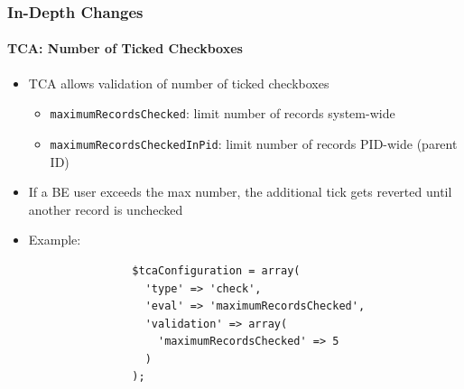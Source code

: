 \begin{frame}[fragile]
	\frametitle{In-Depth Changes}
	\framesubtitle{TCA: Number of Ticked Checkboxes}

	\lstset{
		basicstyle=\tiny\ttfamily
	}

	\begin{itemize}
		\item TCA allows validation of number of ticked checkboxes

			\begin{itemize}
				\item \texttt{maximumRecordsChecked}:\newline
					limit number of records system-wide
				\item \texttt{maximumRecordsCheckedInPid}:\newline
					limit number of records PID-wide (parent ID)
			\end{itemize}

		\item If a BE user exceeds the max number, the additional tick gets reverted until another record is unchecked

		\item Example:

			\begin{lstlisting}
				$tcaConfiguration = array(
				  'type' => 'check',
				  'eval' => 'maximumRecordsChecked',
				  'validation' => array(
				    'maximumRecordsChecked' => 5
				  )
				);
			\end{lstlisting}

	\end{itemize}

\end{frame}


